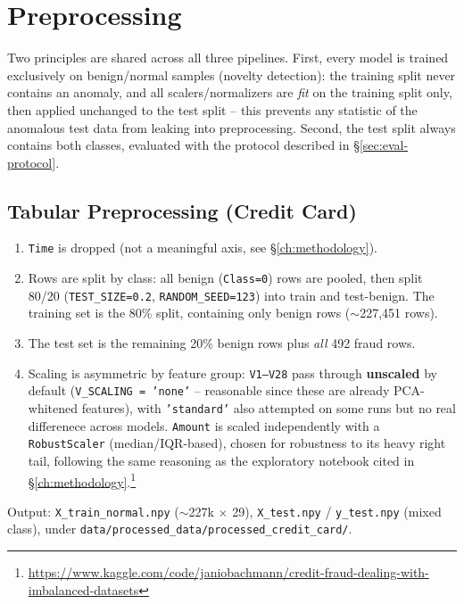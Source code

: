 \section{Preprocessing}
\label{sec:preprocessing}

Two principles are shared across all three pipelines. First, every model is trained exclusively on benign/normal samples (novelty detection): the training split never contains an anomaly, and all scalers/normalizers are \emph{fit} on the training split only, then applied unchanged to the test split -- this prevents any statistic of the anomalous test data from leaking into preprocessing. Second, the test split always contains both classes, evaluated with the protocol described in \S\ref{sec:eval-protocol}.

\subsection{Tabular Preprocessing (Credit Card)}

\begin{enumerate}
  \item \texttt{Time} is dropped (not a meaningful axis, see \S\ref{ch:methodology}).
  \item Rows are split by class: all benign (\texttt{Class=0}) rows are pooled, then split 80/20 (\texttt{TEST\_SIZE=0.2}, \texttt{RANDOM\_SEED=123}) into train and test-benign. The training set is the 80\% split, containing only benign rows ($\sim$227{,}451 rows).
  \item The test set is the remaining 20\% benign rows plus \emph{all} 492 fraud rows.
  \item Scaling is asymmetric by feature group: \texttt{V1--V28} pass through \textbf{unscaled} by default (\texttt{V\_SCALING = 'none'} -- reasonable since these are already PCA-whitened features), with \texttt{'standard'} also attempted on some runs but no real differenece across models. \texttt{Amount} is scaled independently with a \texttt{RobustScaler} (median/IQR-based), chosen for robustness to its heavy right tail, following the same reasoning as the exploratory notebook cited in \S\ref{ch:methodology}.\footnote{\url{https://www.kaggle.com/code/janiobachmann/credit-fraud-dealing-with-imbalanced-datasets}}
\end{enumerate}

Output: \texttt{X\_train\_normal.npy} ($\sim$227k $\times$ 29), \texttt{X\_test.npy} / \texttt{y\_test.npy} (mixed class), under \texttt{data/processed\_data/processed\_credit\_card/}.

